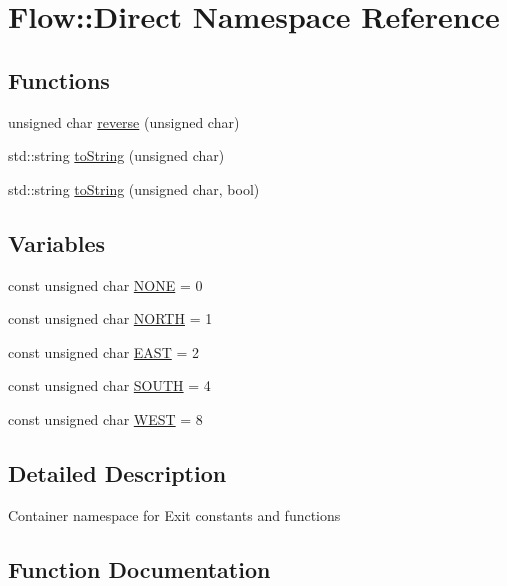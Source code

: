 \hypertarget{namespace_flow_1_1_direct}{}\section{Flow\+:\+:Direct Namespace Reference}
\label{namespace_flow_1_1_direct}
\subsection*{Functions}
\begin{DoxyCompactItemize}
\item 
unsigned char \hyperlink{namespace_flow_1_1_direct_a441c0002a213a4fd71976e704ad16f33}{reverse} (unsigned char)
\item 
std\+::string \hyperlink{namespace_flow_1_1_direct_a7730679ec550d52f40e1ca296bf8ae67}{to\+String} (unsigned char)
\item 
std\+::string \hyperlink{namespace_flow_1_1_direct_ad0809c7c6050ad4d27dea7be23af40a8}{to\+String} (unsigned char, bool)
\end{DoxyCompactItemize}
\subsection*{Variables}
\begin{DoxyCompactItemize}
\item 
const unsigned char \hyperlink{namespace_flow_1_1_direct_a3a2e55bf055fca941f5bd430389462ea}{N\+O\+NE} = 0
\item 
const unsigned char \hyperlink{namespace_flow_1_1_direct_aeaeaa2d58de609af52cf2666bf3868a7}{N\+O\+R\+TH} = 1
\item 
const unsigned char \hyperlink{namespace_flow_1_1_direct_a8ff328289a90b44b52de5251b6da59ec}{E\+A\+ST} = 2
\item 
const unsigned char \hyperlink{namespace_flow_1_1_direct_ac93371fec14643176c2413f84b02b9ad}{S\+O\+U\+TH} = 4
\item 
const unsigned char \hyperlink{namespace_flow_1_1_direct_a71884fb1eefd6b366b08e03e8eca5205}{W\+E\+ST} = 8
\end{DoxyCompactItemize}


\subsection{Detailed Description}
Container namespace for Exit constants and functions 

\subsection{Function Documentation}
\hypertarget{namespace_flow_1_1_direct_a441c0002a213a4fd71976e704ad16f33}{}\label{namespace_flow_1_1_direct_a441c0002a213a4fd71976e704ad16f33} 
